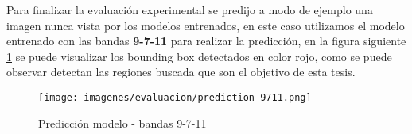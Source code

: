 Para finalizar la evaluación experimental se predijo a modo de ejemplo una imagen nunca vista por los modelos entrenados, en este caso utilizamos el modelo entrenado con las bandas \textbf{9-7-11} para realizar la predicción, en la figura siguiente  \ref{Fig: TP} se puede visualizar los bounding box detectados en color rojo, como se puede observar detectan las regiones buscada que son el objetivo de esta tesis.

\begin{figure}[H]\centering
  \texttt{[image: imagenes/evaluacion/prediction-9711.png]}
  \caption{Predicción modelo - bandas 9-7-11} \label{Fig: TP}
\end{figure}














